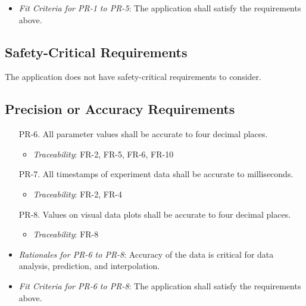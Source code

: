 \documentclass[12pt]{article}
\begin{document}
\begin{itemize}
  \item \textit{Fit Criteria for PR-1 to PR-5}: The application shall satisfy the requirements above.
\end{itemize}

\subsection{Safety-Critical Requirements}
The application does not have safety-critical requirements to consider.

\subsection{Precision or Accuracy Requirements}
\begin{enumerate}
  \item[PR-6.] All parameter values shall be accurate to four decimal places.
    \begin{itemize}
      \item \textit{Traceability}: FR-2, FR-5, FR-6, FR-10
    \end{itemize}
  \item[PR-7.] All timestamps of experiment data shall be accurate to milliseconds.
    \begin{itemize}
      \item \textit{Traceability}: FR-2, FR-4
    \end{itemize}
  \item[PR-8.] Values on visual data plots shall be accurate to four decimal places.
    \begin{itemize}
        \item \textit{Traceability}: FR-8
    \end{itemize}
\end{enumerate}
\begin{itemize}
  \item \textit{Rationales for PR-6 to PR-8}: Accuracy of the data is critical for data analysis, prediction, and interpolation.
  \item \textit{Fit Criteria for PR-6 to PR-8}: The application shall satisfy the requirements above.
\end{itemize}
\end{document}
